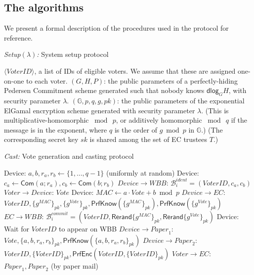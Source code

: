 \documentclass[12pt,a4paper]{article}
\newcommand{\commit}{\mathsf{Com}}
\newcommand{\PrfEnc}{\mathsf{PrfEnc}}
\newcommand{\PrfKnow}{\mathsf{PrfKnow}}
\newcommand{\rerand}{\mathsf{Rerand}}
\newcommand{\dlog}{\mathsf{dlog}}
\theoremstyle{definition}
\newcommand{\Vote}{\mathit{Vote}}
\newcommand{\VoterID}{\mathit{VoterID}}
\newcommand{\Paper}{\mathit{Paper}}
\newcommand{\Mac}{\mathit{MAC}}
\newcommand{\Wbb}{\mathit{WBB}}
\begin{document}
\subsection{The algorithms}\label{app-algorithms}
We present a formal description of the procedures used in the protocol for reference.
\singlespacing
\begin{algorithm} 	\caption{\textit{Setup}$(\lambda)$\textit{:} System setup protocol}
	\begin{algorithmic}[1]
\State $\langle \VoterID \rangle$, a list of IDs of eligible voters.  We assume that these are assigned one-on-one to each voter.
\State	$(G,H,P)$: the public parameters of a perfectly-hiding Pedersen Commitment scheme  generated such that nobody knows $\dlog_G H$, with security parameter $\lambda$.
\State $(\mathbb{G}, p, q, g, pk)$: the public parameters of the exponential ElGamal encryption scheme generated with security parameter $\lambda$.
(This is multiplicative-homomorphic $\bmod\ p$, or additively homomorphic $\bmod\ q$ if the message is in the exponent, where $q$ is the order of $g\bmod p$ in $\mathbb{G}$.)
\State  (The corresponding secret key  $sk$ is shared among the set of EC trustees $T$.)
\end{algorithmic}
	\label{fig:setup}
\end{algorithm}
\begin{algorithm} 	\caption{\textit{Cast:} Vote generation and casting protocol}
	\begin{algorithmic}[1]
	\State Device: $a,b,r_a,r_b\leftarrow\{1,\ldots,q-1\}$ (uniformly at random)
	\State Device: $c_a\leftarrow\commit(a;r_a), c_b\leftarrow\commit(b;r_b)$
	\State $Device\rightarrow \Wbb$: $\mathcal{B}^{ident}_i=(\VoterID, c_a, c_b)$
	\State $Voter\rightarrow Device$: $\Vote$
	\State Device: $\Mac\leftarrow a\cdot Vote+b\bmod p$
	\State $Device\rightarrow EC$: $\VoterID, \{g^\Mac\}_{pk}, \{g^\Vote\}_{pk}, \PrfKnow(\{g^\Mac\}_{pk}), \PrfKnow(\{g^\Vote\}_{pk})$%
	\State $EC\rightarrow \Wbb$: $\mathcal{B}^{commit}_i=(\VoterID, \rerand\{g^\Mac\}_{pk}, \rerand\{g^\Vote\}_{pk})$ \label{Step:ECPostsVoteMAC}
	\State Device: Wait for $\VoterID$ to appear on WBB
	\State $Device\rightarrow \Paper_1$: $\Vote, \{a,b,r_a,r_b\}_{pk}, \PrfKnow(\{a,b,r_a,r_b\}_{pk})$
	\State $Device\rightarrow \Paper_2$: $\VoterID, \{\VoterID\}_{pk}, \PrfEnc(\VoterID, \{\VoterID\}_{pk})$
	\State $Voter\rightarrow EC$: $\Paper_1, \Paper_2$ (by paper mail)
	\end{algorithmic}
\label{fig:genAndCasting}
\end{algorithm}
\end{document}
